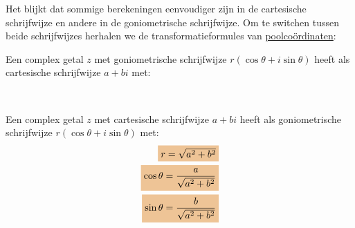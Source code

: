 \documentclass{ximera}
\begin{document}
Het blijkt dat sommige berekeningen eenvoudiger zijn in de cartesische schrijfwijze en andere in de goniometrische schrijfwijze. Om te switchen tussen beide schrijfwijzes herhalen we de transformatieformules van \hyperref[xim:poolcoordinaten]{poolcoördinaten}:

\begin{proposition}\label{eig:transformatie_complexe_getallen} \nl 
	
	Een complex getal $z$ met goniometrische schrijfwijze $r(\cos \theta + i\sin\theta)$ heeft als cartesische schrijfwijze $a+bi$ met:
	\begin{center}
		\\
	\end{center}
	Een complex getal $z$ met cartesische schrijfwijze $a+bi$ heeft als goniometrische schrijfwijze $r(\cos \theta + i\sin\theta)$ met:
	\begin{align*}
	\important{r = \sqrt{a^2+b^2}} \\
	\important{\cos\theta  = \dfrac{a}{\sqrt{a^2+b^2}}}\\
	\important{\sin\theta  = \dfrac{b}{\sqrt{a^2+b^2}}}
	\end{align*}
\end{proposition}
\end{document}
